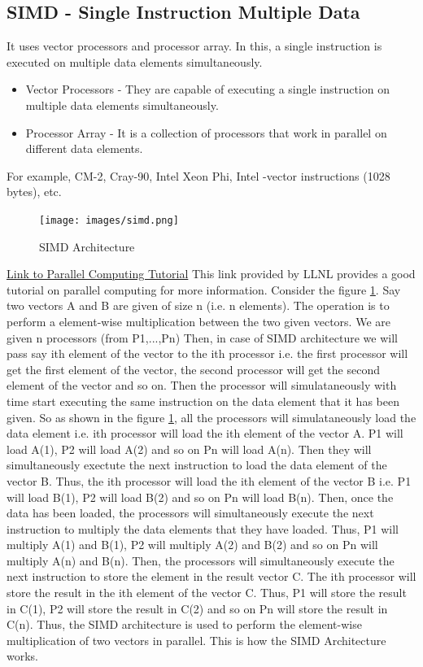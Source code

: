 \documentclass[12pt]{article}
\begin{document}
\subsection{SIMD - Single Instruction Multiple Data}
It uses vector processors and processor array. In this, a single instruction is executed on multiple data elements simultaneously. 
\begin{itemize}
    \item Vector Processors - They are capable of executing a single instruction on multiple data elements simultaneously.
    \item Processor Array - It is a collection of processors that work in parallel on different data elements.
\end{itemize}
For example, CM-2, Cray-90, Intel Xeon Phi, Intel -vector instructions (1028 bytes), etc.
\begin{figure}[H]
    \centering
    \texttt{[image: images/simd.png]}
    \caption{SIMD Architecture}
    \label{fig:simd}
\end{figure}
\href{http://www.llnl.gov/computing/tutorials/parallel_comp/}{Link to Parallel Computing Tutorial}
This link provided by LLNL provides a good tutorial on parallel computing for more information. 
Consider the figure \ref{fig:simd}. Say two vectors A and B are given of size n (i.e. n elements). The operation is to perform 
a element-wise multiplication between the two given vectors. We are given n processors (from P1,...,Pn) Then, in case of SIMD architecture we will pass 
say ith element of the vector to the ith processor i.e. the first processor will get the first element of the vector,
the second processor will get the second element of the vector and so on. Then the processor will simulataneously with time
start executing the same instruction on the data element that it has been given. So as shown in the figure \ref{fig:simd}, 
all the processors will simulataneously load the data element i.e. ith processor will load the ith element of the vector A.
P1 will load A(1), P2 will load A(2) and so on Pn will load A(n). Then they will simultaneously exectute the next instruction to load the data element of the vector B. 
Thus, the ith processor will load the ith element of the vector B i.e. P1 will load B(1), P2 will load B(2) and so on Pn will load B(n). 
Then, once the data has been loaded, the processors will simultaneously execute the next instruction to multiply the data elements that they have loaded.
Thus, P1 will multiply A(1) and B(1), P2 will multiply A(2) and B(2) and so on Pn will multiply A(n) and B(n). 
Then, the processors will simultaneously execute the next instruction to store the element in the result vector C. The ith processor will store the result in the ith element of the vector C.
Thus, P1 will store the result in C(1), P2 will store the result in C(2) and so on Pn will store the result in C(n).
Thus, the SIMD architecture is used to perform the element-wise multiplication of two vectors in parallel. This is how the SIMD Architecture works.
\end{document}
